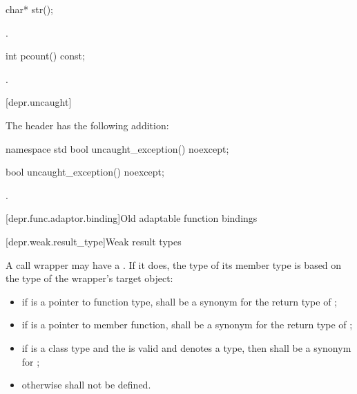 %
\begin{itemdecl}
char* str();
\end{itemdecl}

\begin{itemdescr}
\pnum
\returns
{}.
\end{itemdescr}

%
\begin{itemdecl}
int pcount() const;
\end{itemdecl}

\begin{itemdescr}
\pnum
\returns
{}.
\end{itemdescr}

[depr.uncaught]{}

\pnum
The header
%
 has the following addition:

%
\begin{codeblock}
namespace std {
  bool uncaught_exception() noexcept;
}
\end{codeblock}

%
\begin{itemdecl}
bool uncaught_exception() noexcept;
\end{itemdecl}

\begin{itemdescr}
\pnum
\returns {}.
\end{itemdescr}

[depr.func.adaptor.binding]{Old adaptable function bindings}

[depr.weak.result_type]{Weak result types}

\pnum
A call wrapper may have a .
If it does, the type of its member type 
is based on the type  of the wrapper's target object:
\begin{itemize}
\item if  is a pointer to function type,
 shall be a synonym for the return type of ;
\item if  is a pointer to member function,
 shall be a synonym for the return type of ;
\item if  is a class type
and the   is valid and denotes a type,
then  shall be a synonym for ;
\item otherwise  shall not be defined.
\end{itemize}

